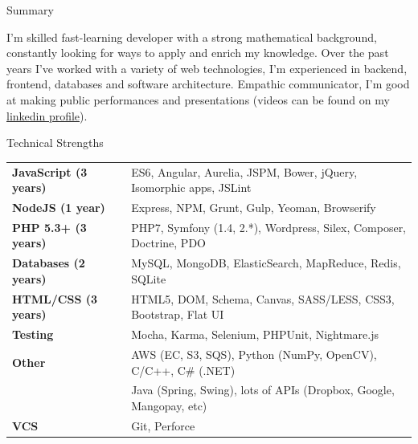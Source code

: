\documentclass{resume} %
\begin{document}

\begin{rSection}{Summary}

I'm skilled fast-learning developer with a strong mathematical background, constantly looking for ways to apply and enrich my knowledge.
Over the past years I've worked with a variety of web technologies, I'm experienced in backend, frontend, databases and software architecture.
Empathic communicator, I'm good at making public performances and presentations
(videos can be found on my \href{http://linkedin.com/in/mikhalchenkoa}{linkedin profile}).

\end{rSection}



\begin{rSection}{Technical Strengths}

\begin{tabular}{ @{} >{\bfseries}l @{\hspace{4ex}} l }
JavaScript (3 years) & ES6, Angular, Aurelia, JSPM, Bower, jQuery, Isomorphic apps, JSLint \\
NodeJS (1 year) & Express, NPM, Grunt, Gulp, Yeoman, Browserify \\
PHP 5.3+ (3 years) & PHP7, Symfony (1.4, 2.*), Wordpress, Silex, Composer, Doctrine, PDO \\
Databases (2 years) & MySQL, MongoDB, ElasticSearch, MapReduce, Redis, SQLite \\
HTML/CSS (3 years) & HTML5, DOM, Schema, Canvas, SASS/LESS, CSS3, Bootstrap, Flat UI \\
Testing & Mocha, Karma, Selenium, PHPUnit, Nightmare.js \\
Other & AWS (EC, S3, SQS), Python (NumPy, OpenCV), C/C++, C\# (.NET) \\
 & Java (Spring, Swing), lots of APIs (Dropbox, Google, Mangopay, etc) \\
VCS & Git, Perforce \\
\end{tabular}

\end{rSection}
\end{document}
